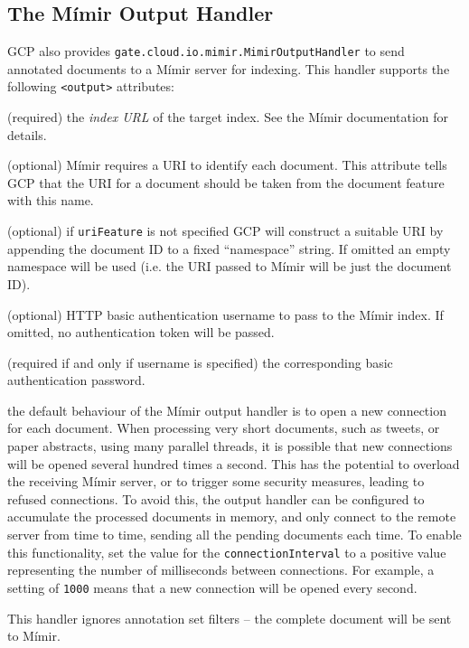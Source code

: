 \subsection{The M\'{i}mir Output Handler}

GCP also provides \verb!gate.cloud.io.mimir.MimirOutputHandler! to send annotated documents to a M\'{i}mir server for indexing.  This handler supports the following \verb!<output>! attributes:

\bde
\item[indexUrl] (required) the {\em index URL} of the target index.  See the
  M\'{i}mir documentation for details.
\item[uriFeature] (optional) M\'{i}mir requires a URI to identify each
  document.  This attribute tells GCP that the URI for a document should be
  taken from the document feature with this name.
\item[namespace] (optional) if \verb!uriFeature! is not specified GCP will
  construct a suitable URI by appending the document ID to a fixed
  ``namespace'' string.  If omitted an empty namespace will be used (i.e. the
  URI passed to M\'{i}mir will be just the document ID).
\item[username] (optional) HTTP basic authentication username to pass to the
  M\'{i}mir index.  If omitted, no authentication token will be passed.
\item[password] (required if and only if username is specified) the
  corresponding basic authentication password.
\item[connectionInterval] the default behaviour of the M\'{i}mir output handler
  is to open a new connection for each document. When processing very short
  documents, such as tweets, or paper abstracts, using many parallel threads, 
  it is possible that new connections will be opened several hundred times a
  second. This has the potential to overload the receiving M\'{i}mir server, or
  to trigger some security measures, leading to refused connections. To avoid 
  this, the output handler can be configured to accumulate the processed 
  documents in memory, and only connect to the remote server from time to time, 
  sending all the pending documents each time. To enable this functionality, set 
  the value for the {\tt connectionInterval} to a positive value representing 
  the number of milliseconds between connections. For example, a setting of 
  {\tt 1000} means that a new connection will be opened every second.
\ede

This handler ignores annotation set filters -- the complete document will be
sent to M\'{i}mir.

